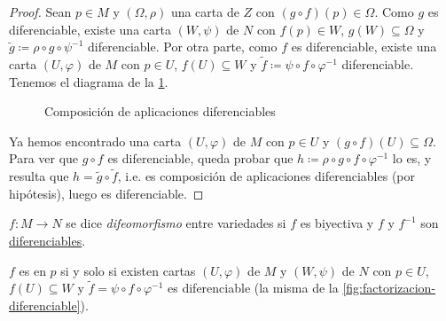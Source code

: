 \documentclass[../VD.tex]{subfiles}
\begin{document}
\begin{proof}
  Sean \(p \in M\) y \((\Omega,\rho)\) una carta de \(Z\) con \((g \circ f)(p)
  \in \Omega\). Como \(g\) es diferenciable, existe una carta \((W,\psi)\) de
  \(N\) con \(f(p) \in W\), \(g(W) \subseteq \Omega\) y \(\widetilde{g}
  \coloneqq \rho \circ g \circ \psi^{-1}\) diferenciable. Por otra parte, como
  \(f\) es diferenciable, existe una carta \((U,\varphi)\) de \(M\) con \(p \in
  U\), \(f(U) \subseteq W\) y \(\widetilde{f} \coloneqq \psi \circ f \circ
  \varphi^{-1}\) diferenciable. Tenemos el diagrama de la \cref{fig:comp-dif-cd}.

  \begin{figure}[h]
    \centering
    \caption{Composición de aplicaciones diferenciables}
    \label{fig:comp-dif-cd}
  \end{figure}

  Ya hemos encontrado una carta \((U,\varphi)\) de \(M\) con \(p \in U\) y \((g
  \circ f)(U) \subseteq \Omega\).
  Para ver que \(g \circ f\) es diferenciable, queda probar que
  \(h \coloneqq \rho \circ g \circ f \circ \varphi^{-1}\) lo es, y resulta que
  \(h = \widetilde{g} \circ \widetilde{f}\), i.e. es composición de aplicaciones
  diferenciables (por hipótesis), luego es diferenciable.
\end{proof}

\begin{definition}[difeomorfismo]
  \label{def:difeomorfismo}
  \(f \colon M \to N\) se dice \emph{difeomorfismo} entre variedades si \(f\) es
  biyectiva y \(f\) y \(f^{-1}\) son \hyperref[def:diferenciable]{diferenciables}.
\end{definition}

\begin{lemma}
  \(f\) es  en \(p\) si y solo si existen cartas
  \((U,\varphi)\) de \(M\) y \((W,\psi)\) de \(N\) con \(p \in U\), \(f(U)
  \subseteq W\) y \(\widetilde{f} = \psi \circ f \circ \varphi^{-1}\) es
  diferenciable (la misma de la \cref{fig:factorizacion-diferenciable}).
\end{lemma}
\end{document}
